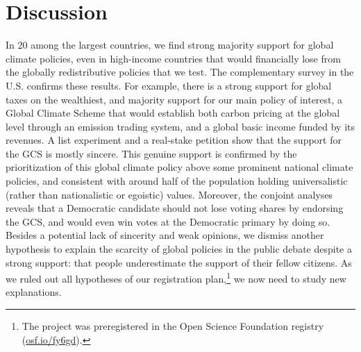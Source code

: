\section{Discussion} %
In 20 among the largest countries, we find strong majority support for global climate policies, even in high-income countries that would financially lose from the globally redistributive policies that we test. The complementary survey in the U.S. confirms these results. For example, there is a strong support for global taxes on the wealthiest, and majority support for our main policy of interest, a Global Climate Scheme that would establish both carbon pricing at the global level through an emission trading system, and a global basic income funded by its revenues. A list experiment and a real-stake petition show that the support for the GCS is mostly sincere. This genuine support is confirmed by the prioritization of this global climate policy above some prominent national climate policies, and consistent with around half of the population holding universalistic (rather than nationalistic or egoistic) values. Moreover, the conjoint analyses reveals that a Democratic candidate should not lose voting shares by endorsing the GCS, and would even win votes at the Democratic primary by doing so. Besides a potential lack of sincerity and weak opinions, we dismiss another hypothesis to explain the scarcity of global policies in the public debate despite a strong support: that people underestimate the support of their fellow citizens. As we ruled out all hypotheses of our registration plan,\footnote{The project was preregistered in the Open Science Foundation registry (\href{https://osf.io/fy6gd}{osf.io/fy6gd}).} we now need to study new explanations. %

